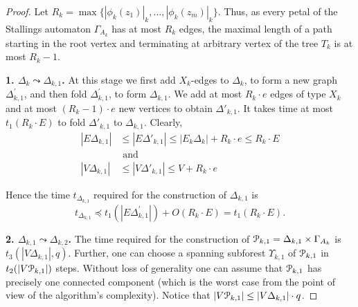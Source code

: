 \documentclass[a4paper,12pt]{article}
\newcommand{\G}{\Gamma }
\newcommand{\D}{\Delta }
\newcommand{\T}{\Theta }
\newcommand{\U}{\Upsilon }
\newcommand{\cP}{{\cal{P}}}
\numberwithin{equation}{section}
\numberwithin{figure}{section}
\begin{document}
\begin{proof} Let $R_k  = \max \{ |\phi_k(z_1)|_k, \ldots, |\phi_k(z_m)|_k\}$. Thus, as
every petal of the Stallings automaton $\G_{A_k}$ has at most $R_k$
edges, the maximal length of a path starting in the root vertex
and terminating at arbitrary vertex of the tree $T_k$ is at most
$R_k-1$.

{\bf 1. $\D_k \leadsto \D_{k,1}$.} At this stage we first add
$X_k$-edges to $\D_k$, to form a new graph $\D^\prime_{k,1}$, and then
fold $\D^\prime_{k,1}$, to form $\D_{k,1}$.  We add at most $R_k \cdot e$
edges of type $X_k$ and at most $(R_k-1)\cdot e$ new vertices to
obtain $\D'_{k,1}$. It takes time at most $t_1(R_k \cdot E )$ to fold
$\D'_{k,1}$ to  $\D_{k,1}$. Clearly,
\begin{equation}\label{evth1}
\begin{split}
|E\D_{k,1} | &\le |E\D'_{k,1} | \le |E_k\D_k | + R_k \cdot e \le
R_k \cdot E\\
&{\textrm{ and }}\\
|V \D_{k,1}| &\le |V \D'_{k,1} | \le V + R_k\cdot e
\end{split}
\end{equation}

Hence the time $t_{\D_{k,1}}$ required for the construction of $\D_{k,1}$
is
\begin{equation}\label{theta1}
t_{\D_{k,1}} \preceq t_1(|E \D_{k,1}^\prime |) + O(R_k \cdot E) =t_1(R_k
\cdot E) .
\end{equation}

{\bf 2. $\D_{k,1} \leadsto \D_{k,2}$.} The time required for the
construction of $\cP_{k,1}=\D_{k,1}\times \G_{A_k}$ is $t_3(|V \D_{k,1}|, q)$.
Further, one can choose a spanning subforest $\U_{k,1}$ of $\cP_{k,1}$ in
$t_2(|V\cP_{k,1}|)$ steps. Without loss of generality one can assume
that $\cP_{k,1}$ has precisely one connected component (which is the
worst case from the point of view of the algorithm's complexity).
Notice that $|V\cP_{k,1}| \le |V\D_{k,1}|\cdot q$.



\end{proof}
\end{document}
